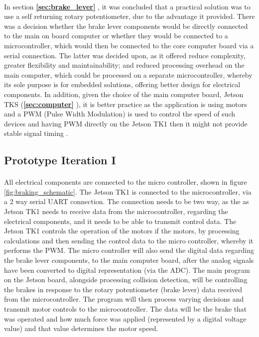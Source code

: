 \documentclass[a4paper]{report}
\begin{document}
\paragraph{}In section \textbf{\ref{sec:brake_lever} }, it was concluded that a practical solution was to use a self returning rotary potentiometer, due to the advantage it provided. There was a decision whether the brake lever components would be directly connected to the main on board computer or whether they would be connected to a microcontroller, which would then be connected to the core computer board via a serial connection. The latter was decided upon, as it offered reduce complexity, greater flexibility and maintainability; and reduced processing overhead on the main computer, which could be processed on a separate microcontroller, whereby its sole purpose is for embedded solutions, offering better design for electrical components. In addition, given the choice of the main computer board, Jetson TKS (\textbf{\ref{sec:computer} }), it is better practice as the application is using motors and a PWM (Pulse Width Modulation) is used to control the speed of such devices and having PWM directly on the Jetson TK1 then it might not provide stable signal timing \cite{jetson_microcontroller_support}.

\subsection{Prototype Iteration I}
\paragraph{}All electrical components are connected to the micro controller, shown in figure \ref{fig:braking_schematic}. The Jetson TK1 is connected to the microcontroller, via a 2 way serial UART connection. The connection needs to be two way, as the as Jetson TK1 needs to receive data from the microcontroller, regarding the electrical components, and it needs to be able to transmit control data. The Jetson TK1 controls the operation of the motors if the motors, by processing calculations and then sending the control data to the micro controller, whereby it performs the PWM. The micro controller will also send the digital data regarding the brake lever components, to the main computer board, after the analog signals have been converted to digital representation (via the ADC). The main program on the Jetson board, alongside processing collision detection, will be controlling the brakes in response to the rotary potentiometer (brake lever) data received from the microcontroller. The program will then process varying decisions and transmit motor controls to the microcontroller. The data will be the brake that was operated and how much force was applied (represented by a digital voltage value) and that value determines the motor speed.
\end{document}

